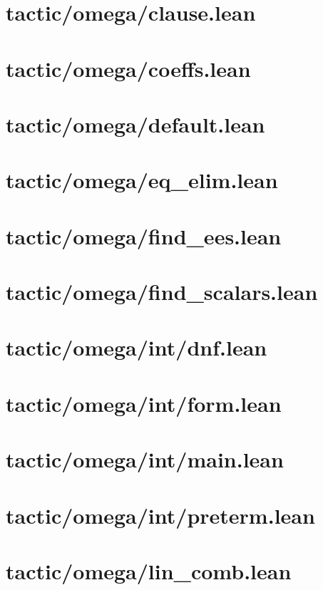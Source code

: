 \documentclass{article}
\begin{document}
\section{tactic/omega/clause.lean}\section{tactic/omega/coeffs.lean}\section{tactic/omega/default.lean}\section{tactic/omega/eq\_elim.lean}\section{tactic/omega/find\_ees.lean}\section{tactic/omega/find\_scalars.lean}\section{tactic/omega/int/dnf.lean}\section{tactic/omega/int/form.lean}\section{tactic/omega/int/main.lean}\section{tactic/omega/int/preterm.lean}\section{tactic/omega/lin\_comb.lean}\secti
\end{document}
